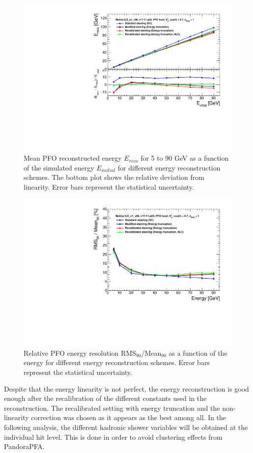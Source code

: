 \begin{figure}[htbp!]
  \centering
  \includegraphics[width=0.6\linewidth]{../Thesis_Plots/ILD/CheckCalib/Comparison_linearity_Curves_PFO}
  \caption{Mean PFO reconstructed energy $E_{reco}$ for 5 to 90 GeV \kzeroL{} as a function of the simulated energy $E_{initial}$ for different energy reconstruction schemes. The bottom plot shows the relative deviation from linearity. Error bars represent the statistical uncertainty.} \label{fig:linpfo}
\end{figure}

\begin{figure}[htbp!]
  \centering
  \includegraphics[width=0.6\linewidth]{../Thesis_Plots/ILD/CheckCalib/Comparison_resolution_Curves_PFO}
  \caption{Relative PFO energy resolution RMS$_{90}$/Mean$_{90}$ as a function of the energy for different energy reconstruction schemes. Error bars represent the statistical uncertainty.} \label{fig:resopfo}
\end{figure}

Despite that the energy linearity is not perfect, the energy reconstruction is good enough after the recalibration of the different constants used in the reconstruction. The recalibrated setting with energy truncation and the non-linearity correction was chosen as it appears as the best among all. In the following analysis, the different hadronic shower variables will be obtained at the individual hit level. This is done in order to avoid clustering effects from PandoraPFA.

